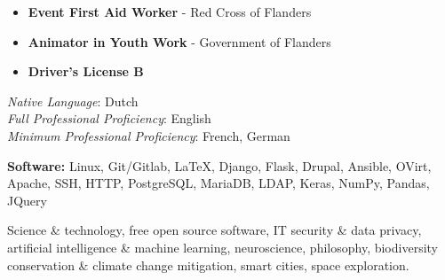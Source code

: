 
\begin{itemize}
    \item \textbf{Event First Aid Worker} - Red Cross of Flanders
    \item \textbf{Animator in Youth Work} - Government of Flanders
    \item \textbf{Driver's License B}
\end{itemize}








\textit{Native Language}: Dutch \\
\textit{Full Professional Proficiency}: English \\
\textit{Minimum Professional Proficiency}: French, German \\





\smallskip

\textbf{Software:} Linux, Git/Gitlab, \LaTeX, Django, Flask, Drupal, Ansible, OVirt, Apache, SSH, HTTP, PostgreSQL, MariaDB, LDAP, Keras, NumPy, Pandas, JQuery

Science \& technology, free open source software, IT security \& data privacy, artificial intelligence \& machine learning, neuroscience, philosophy, biodiversity conservation \& climate change mitigation, smart cities, space exploration.

